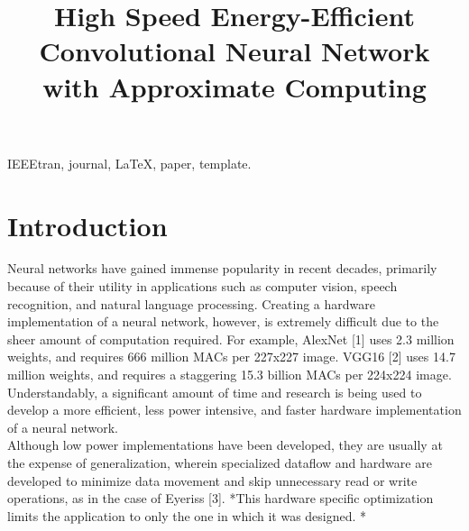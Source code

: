 \documentclass[conference]{IEEEtran}
\begin{document}
\title{High Speed Energy-Efficient Convolutional Neural Network with Approximate Computing}

\author{
\and
{}
}

\maketitle

\begin{abstract}
\blindtext[1]
\end{abstract}

\begin{IEEEkeywords}
IEEEtran, journal, \LaTeX, paper, template.
\end{IEEEkeywords}

\IEEEpeerreviewmaketitle

\section{Introduction}
	Neural networks have gained immense popularity in recent decades, primarily because of their utility in applications such as computer vision, speech recognition, and natural language processing. Creating a hardware implementation of a neural network, however, is extremely difficult due to the sheer amount of computation required. For example, AlexNet [1] uses 2.3 million weights, and requires 666 million MACs per 227x227 image. VGG16 [2] uses 14.7 million weights, and requires a staggering 15.3 billion MACs per 224x224 image. Understandably, a significant amount of time and research is being used to develop a more efficient, less power intensive, and faster hardware implementation of a neural network.\\
	\indent Although low power implementations have been developed, they are usually at the expense of generalization, wherein specialized dataflow and hardware are developed to minimize data movement and skip unnecessary read or write operations, as in the case of Eyeriss [3]. *This hardware specific optimization limits the application to only the one in which it was designed. *
\end{document}
